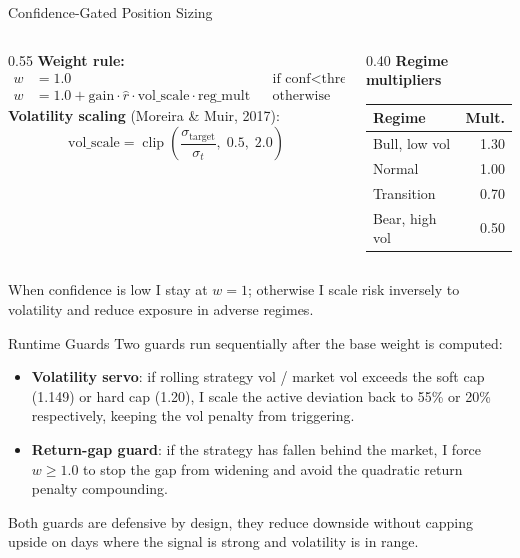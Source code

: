 \documentclass[aspectratio=169]{beamer}
\begin{document}
\begin{frame}{Confidence-Gated Position Sizing}
\small
\begin{columns}[T]
\begin{column}{0.55\textwidth}
\textbf{Weight rule:}
\begin{align*}
w &= 1.0 && \text{if conf} < \text{threshold} \\[2pt]
w &= 1.0 + \text{gain} \cdot \hat{r} \cdot \text{vol\_scale} \cdot \text{reg\_mult} && \text{otherwise}
\end{align*}
\vspace{0.05cm}
\textbf{Volatility scaling} (Moreira \& Muir, 2017):
\[
\text{vol\_scale} = \operatorname{clip}\!\left(\frac{\sigma_{\text{target}}}{\sigma_t},\; 0.5,\; 2.0\right)
\]
\end{column}
\begin{column}{0.40\textwidth}
\textbf{Regime multipliers}
\vspace{0.15cm}
\begin{center}
\small
\begin{tabular}{lr}
\toprule
\textbf{Regime} & \textbf{Mult.} \\
\midrule
Bull, low vol  & 1.30 \\
Normal         & 1.00 \\
Transition     & 0.70 \\
Bear, high vol & 0.50 \\
\bottomrule
\end{tabular}
\end{center}
\end{column}
\end{columns}
\vspace{0.15cm}
\normalsize
When confidence is low I stay at $w = 1$; otherwise I scale risk inversely to volatility and reduce exposure in adverse regimes.
\end{frame}

\begin{frame}{Runtime Guards}
Two guards run sequentially after the base weight is computed:

\begin{itemize}
    \item \textbf{Volatility servo}: if rolling strategy vol / market vol exceeds the soft cap (1.149) or hard cap (1.20), I scale the active deviation back to 55\% or 20\% respectively, keeping the vol penalty from triggering.
    \item \textbf{Return-gap guard}: if the strategy has fallen behind the market, I force $w \geq 1.0$ to stop the gap from widening and avoid the quadratic return penalty compounding.
\end{itemize}

\vspace{0.2cm}
Both guards are defensive by design, they reduce downside without capping upside on days where the signal is strong and volatility is in range.
\end{frame}
\end{document}
